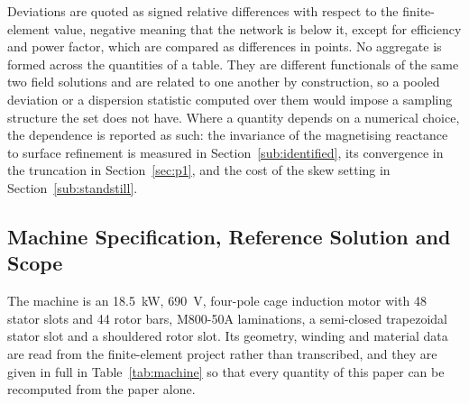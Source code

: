 \documentclass[10pt,a4paper,twocolumn]{article}
\theoremstyle{plain}
\theoremstyle{remark}
\begin{document}
Deviations are quoted as signed relative differences with respect to the
finite-element value, negative meaning that the network is below it,
except for efficiency and power factor, which are compared as
differences in points. No aggregate is formed across the quantities of a
table. They are different functionals of the same two field solutions
and are related to one another by construction, so a pooled deviation or
a dispersion statistic computed over them would impose a sampling
structure the set does not have. Where a quantity depends on a numerical
choice, the dependence is reported as such: the invariance of the
magnetising reactance to surface refinement is measured in
Section~\ref{sub:identified}, its convergence in the truncation in
Section~\ref{sec:p1}, and the cost of the skew setting in
Section~\ref{sub:standstill}.

\subsection{Machine Specification, Reference Solution and Scope}
\label{sub:im_scope}

The machine is an \SI{18.5}{\kilo\watt}, \SI{690}{\volt}, four-pole cage
induction motor with 48 stator slots and 44 rotor bars, M800-50A
laminations, a semi-closed trapezoidal stator slot and a shouldered
rotor slot. Its geometry, winding and material data are read from the
finite-element project rather than transcribed, and they are given in
full in Table~\ref{tab:machine} so that every quantity of this paper can
be recomputed from the paper alone.
\end{document}
